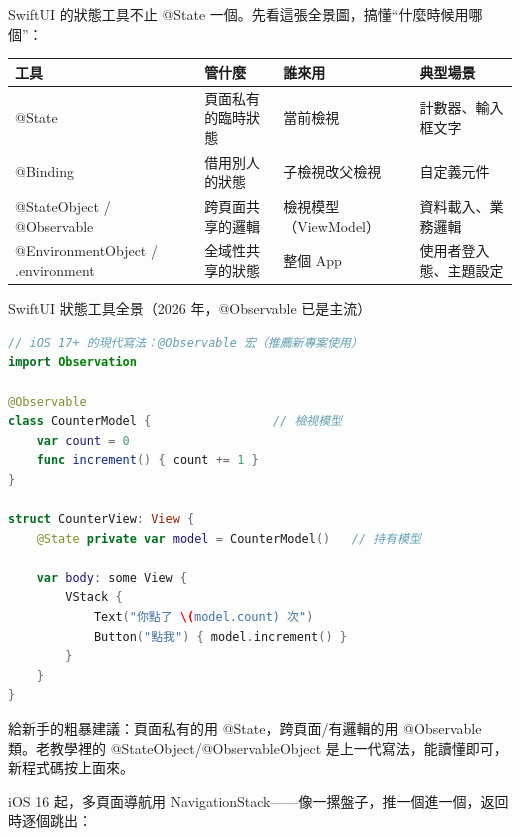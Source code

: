 


SwiftUI 的狀態工具不止 @State 一個。先看這張全景圖，搞懂“什麼時候用哪個”：

\begin{center}
\begin{tabularx}{\linewidth}{|X|X|X|X|}
\hline
\textbf{工具} & \textbf{管什麼} & \textbf{誰來用} & \textbf{典型場景} \tabularnewline
\hline
@State & 頁面私有的臨時狀態 & 當前檢視 & 計數器、輸入框文字 \tabularnewline
@Binding & 借用別人的狀態 & 子檢視改父檢視 & 自定義元件 \tabularnewline
@StateObject / @Observable & 跨頁面共享的邏輯 & 檢視模型（ViewModel） & 資料載入、業務邏輯 \tabularnewline
@EnvironmentObject / .environment & 全域性共享的狀態 & 整個 App & 使用者登入態、主題設定 \tabularnewline
\hline
\end{tabularx}
\end{center}

\begin{center}\small\color{gray}SwiftUI 狀態工具全景（2026 年，@Observable 已是主流）\end{center}

\begin{lstlisting}[language=Swift]
// iOS 17+ 的現代寫法：@Observable 宏（推薦新專案使用）
import Observation

@Observable
class CounterModel {                 // 檢視模型
    var count = 0
    func increment() { count += 1 }
}

struct CounterView: View {
    @State private var model = CounterModel()   // 持有模型

    var body: some View {
        VStack {
            Text("你點了 \(model.count) 次")
            Button("點我") { model.increment() }
        }
    }
}
\end{lstlisting}

給新手的粗暴建議：頁面私有的用 @State，跨頁面/有邏輯的用 @Observable 類。老教學裡的 @StateObject/@ObservableObject 是上一代寫法，能讀懂即可，新程式碼按上面來。


iOS 16 起，多頁面導航用 NavigationStack——像一摞盤子，推一個進一個，返回時逐個跳出：

